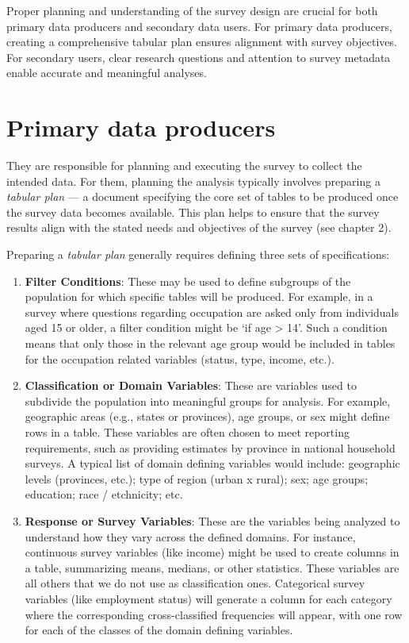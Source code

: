 \documentclass[
  12pt,
]{book}
\begin{document}
Proper planning and understanding of the survey design are crucial for both primary data producers and secondary data users. For primary data producers, creating a comprehensive tabular plan ensures alignment with survey objectives. For secondary users, clear research questions and attention to survey metadata enable accurate and meaningful analyses.

\hypertarget{primary-data-producers}{%
\section{Primary data producers}\label{primary-data-producers}}

They are responsible for planning and executing the survey to collect the intended data. For them, planning the analysis typically involves preparing a \emph{tabular plan} --- a document specifying the core set of tables to be produced once the survey data becomes available. This plan helps to ensure that the survey results align with the stated needs and objectives of the survey (see chapter 2).

Preparing a \emph{tabular plan} generally requires defining three sets of specifications:

\begin{enumerate}
\def\labelenumi{\arabic{enumi}.}
\item
  \textbf{Filter Conditions}: These may be used to define subgroups of the population for which specific tables will be produced. For example, in a survey where questions regarding occupation are asked only from individuals aged 15 or older, a filter condition might be `if age \textgreater{} 14'. Such a condition means that only those in the relevant age group would be included in tables for the occupation related variables (status, type, income, etc.).
\item
  \textbf{Classification or Domain Variables}: These are variables used to subdivide the population into meaningful groups for analysis. For example, geographic areas (e.g., states or provinces), age groups, or sex might define rows in a table. These variables are often chosen to meet reporting requirements, such as providing estimates by province in national household surveys. A typical list of domain defining variables would include: geographic levels (provinces, etc.); type of region (urban x rural); sex; age groups; education; race / etchnicity; etc.
\item
  \textbf{Response or Survey Variables}: These are the variables being analyzed to understand how they vary across the defined domains. For instance, continuous survey variables (like income) might be used to create columns in a table, summarizing means, medians, or other statistics. These variables are all others that we do not use as classification ones. Categorical survey variables (like employment status) will generate a column for each category where the corresponding cross-classified frequencies will appear, with one row for each of the classes of the domain defining variables.
\end{enumerate}
\end{document}
